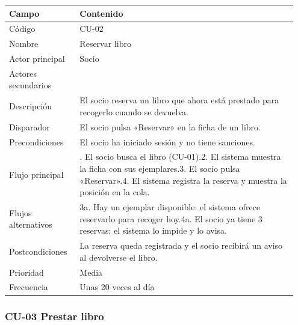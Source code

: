 {\small
\begin{longtable}{@{}>{\raggedright\arraybackslash}p{0.232\linewidth}>{\raggedright\arraybackslash}p{0.717\linewidth}@{}}
\toprule
\textbf{Campo} & \textbf{Contenido} \\
\midrule
\endhead
Código & CU-02 \\
Nombre & Reservar libro \\
Actor principal & Socio \\
Actores secundarios &  \\
Descripción & El socio reserva un libro que ahora está prestado para recogerlo cuando se devuelva. \\
Disparador & El socio pulsa «Reservar» en la ficha de un libro. \\
Precondiciones & El socio ha iniciado sesión y no tiene sanciones. \\
Flujo principal & 1. El socio busca el libro (CU-01).\newline{}2. El sistema muestra la ficha con sus ejemplares.\newline{}3. El socio pulsa «Reservar».\newline{}4. El sistema registra la reserva y muestra la posición en la cola. \\
Flujos alternativos & 3a. Hay un ejemplar disponible: el sistema ofrece reservarlo para recoger hoy.\newline{}4a. El socio ya tiene 3 reservas: el sistema lo impide y lo avisa. \\
Postcondiciones & La reserva queda registrada y el socio recibirá un aviso al devolverse el libro. \\
Prioridad & Media \\
Frecuencia & Unas 20 veces al día \\
\bottomrule
\end{longtable}}

\subsubsection*{CU-03 Prestar libro}

